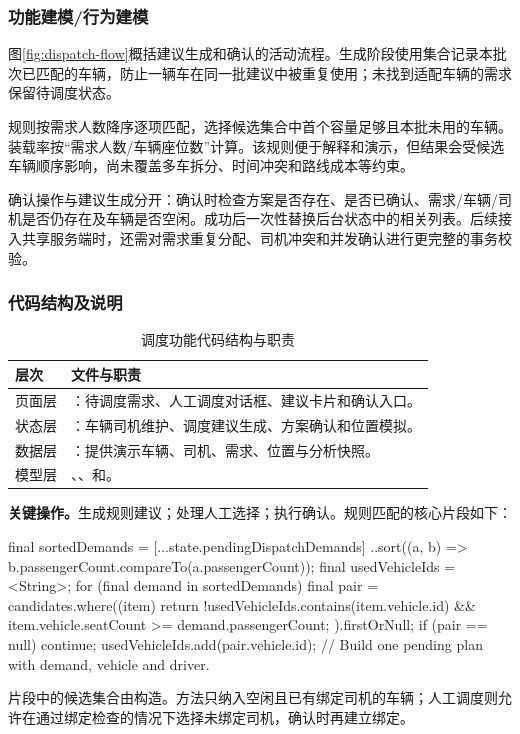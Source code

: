 \subsubsection{功能建模/行为建模}
图\ref{fig:dispatch-flow}概括建议生成和确认的活动流程。生成阶段使用集合记录本批次已匹配的车辆，防止一辆车在同一批建议中被重复使用；未找到适配车辆的需求保留待调度状态。

规则按需求人数降序逐项匹配，选择候选集合中首个容量足够且本批未用的车辆。装载率按“需求人数/车辆座位数”计算。该规则便于解释和演示，但结果会受候选车辆顺序影响，尚未覆盖多车拆分、时间冲突和路线成本等约束。

确认操作与建议生成分开：确认时检查方案是否存在、是否已确认、需求/车辆/司机是否仍存在及车辆是否空闲。成功后一次性替换后台状态中的相关列表。后续接入共享服务端时，还需对需求重复分配、司机冲突和并发确认进行更完整的事务校验。

\subsubsection{代码结构及说明}
\begin{table}[H]\centering\small
\caption{调度功能代码结构与职责}
\begin{tabularx}{\linewidth}{|P{2.1cm}|Y|}\hline
层次 & 文件与职责\\\hline
页面层 & ：待调度需求、人工调度对话框、建议卡片和确认入口。\\\hline
状态层 & ：车辆司机维护、调度建议生成、方案确认和位置模拟。\\\hline
数据层 & ：提供演示车辆、司机、需求、位置与分析快照。\\\hline
模型层 & 、、和。\\\hline
\end{tabularx}\end{table}

\noindent\textbf{关键操作。}生成规则建议；处理人工选择；执行确认。规则匹配的核心片段如下：
\begin{source}
final sortedDemands = [...state.pendingDispatchDemands]
  ..sort((a, b) => b.passengerCount.compareTo(a.passengerCount));
final usedVehicleIds = <String>{};
for (final demand in sortedDemands) {
  final pair = candidates.where((item) {
    return !usedVehicleIds.contains(item.vehicle.id) &&
        item.vehicle.seatCount >= demand.passengerCount;
  }).firstOrNull;
  if (pair == null) continue;
  usedVehicleIds.add(pair.vehicle.id);
  // Build one pending plan with demand, vehicle and driver.
}
\end{source}
\noindent 片段中的候选集合由构造。方法只纳入空闲且已有绑定司机的车辆；人工调度则允许在通过绑定检查的情况下选择未绑定司机，确认时再建立绑定。

